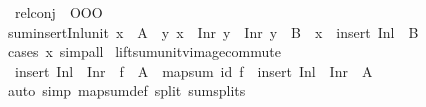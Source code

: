 \begin{isabellebody}
\endisatagML
{\isafoldML}%
%
\isadelimML
%
\endisadelimML
\isanewline
\isanewline
{}\isamarkupfalse%
\isanewline
\ \ rel{\isacharunderscore}{\kern0pt}conj\ {\isacharparenleft}{\kern0pt}\ {\isachardoublequoteopen}OOO{\isachardoublequoteclose}\ {}{}{\isacharparenright}{\kern0pt}%
\isadelimdocument
%
\endisadelimdocument
%
\isatagdocument
%
\isamarkuptrue%
%
\endisatagdocument
{\isafolddocument}%
%
\isadelimdocument
%
\endisadelimdocument
{}\isamarkupfalse%
\ sum{\isacharunderscore}{\kern0pt}insert{\isacharunderscore}{\kern0pt}Inl{\isacharunderscore}{\kern0pt}unit{\isacharcolon}{\kern0pt}\ {\isachardoublequoteopen}x\ {\isasymin}\ A\ {\isasymLongrightarrow}\ {\isacharparenleft}{\kern0pt}{\isasymAnd}y{\isachardot}{\kern0pt}\ x\ {\isacharequal}{\kern0pt}\ Inr\ y\ {\isasymLongrightarrow}\ Inr\ y\ {\isasymin}\ B{\isacharparenright}{\kern0pt}\ {\isasymLongrightarrow}\ x\ {\isasymin}\ insert\ {\isacharparenleft}{\kern0pt}Inl\ {\isacharparenleft}{\kern0pt}{\isacharparenright}{\kern0pt}{\isacharparenright}{\kern0pt}\ B{\isachardoublequoteclose}\isanewline
%
\isadelimproof
\ \ %
\endisadelimproof
%
\isatagproof
{}\isamarkupfalse%
\ {\isacharparenleft}{\kern0pt}cases\ x{\isacharparenright}{\kern0pt}\ {\isacharparenleft}{\kern0pt}simp{\isacharunderscore}{\kern0pt}all{\isacharparenright}{\kern0pt}%
\endisatagproof
{\isafoldproof}%
%
\isadelimproof
\isanewline
%
\endisadelimproof
\isanewline
{}\isamarkupfalse%
\ lift{\isacharunderscore}{\kern0pt}sum{\isacharunderscore}{\kern0pt}unit{\isacharunderscore}{\kern0pt}vimage{\isacharunderscore}{\kern0pt}commute{\isacharcolon}{\kern0pt}\isanewline
\ \ {\isachardoublequoteopen}insert\ {\isacharparenleft}{\kern0pt}Inl\ {\isacharparenleft}{\kern0pt}{\isacharparenright}{\kern0pt}{\isacharparenright}{\kern0pt}\ {\isacharparenleft}{\kern0pt}Inr\ {\isacharbackquote}{\kern0pt}\ f\ {\isacharminus}{\kern0pt}{\isacharbackquote}{\kern0pt}\ A{\isacharparenright}{\kern0pt}\ {\isacharequal}{\kern0pt}\ map{\isacharunderscore}{\kern0pt}sum\ id\ f\ {\isacharminus}{\kern0pt}{\isacharbackquote}{\kern0pt}\ insert\ {\isacharparenleft}{\kern0pt}Inl\ {\isacharparenleft}{\kern0pt}{\isacharparenright}{\kern0pt}{\isacharparenright}{\kern0pt}\ {\isacharparenleft}{\kern0pt}Inr\ {\isacharbackquote}{\kern0pt}\ A{\isacharparenright}{\kern0pt}{\isachardoublequoteclose}\isanewline
%
\isadelimproof
\ \ %
\endisadelimproof
%
\isatagproof
{}\isamarkupfalse%
\ {\isacharparenleft}{\kern0pt}auto\ simp{\isacharcolon}{\kern0pt}\ map{\isacharunderscore}{\kern0pt}sum{\isacharunderscore}{\kern0pt}def\ split{\isacharcolon}{\kern0pt}\ sum{\isachardot}{\kern0pt}splits{\isacharparenright}{\kern0pt}%

\end{isabellebody}
